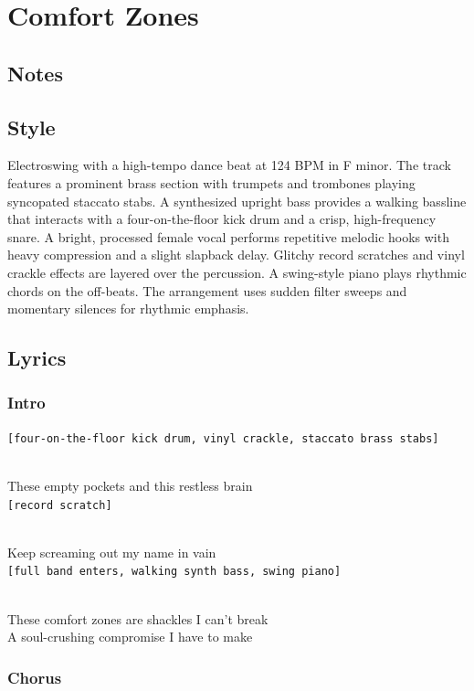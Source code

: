\documentclass[]{article}
\begin{document}
\section{Comfort Zones}\label{comfort-zones}

\subsection{Notes}\label{notes-15}

\subsection{Style}\label{style-15}

Electroswing with a high-tempo dance beat at 124 BPM in F minor. The
track features a prominent brass section with trumpets and trombones
playing syncopated staccato stabs. A synthesized upright bass provides a
walking bassline that interacts with a four-on-the-floor kick drum and a
crisp, high-frequency snare. A bright, processed female vocal performs
repetitive melodic hooks with heavy compression and a slight slapback
delay. Glitchy record scratches and vinyl crackle effects are layered
over the percussion. A swing-style piano plays rhythmic chords on the
off-beats. The arrangement uses sudden filter sweeps and momentary
silences for rhythmic emphasis.

\subsection{Lyrics}\label{lyrics-15}

\subsubsection{Intro}\label{intro-6}

\texttt{{[}four-on-the-floor\ kick\ drum,\ vinyl\ crackle,\ staccato\ brass\ stabs{]}}\strut \\
These empty pockets and this restless brain\\
\texttt{{[}record\ scratch{]}}\strut \\
Keep screaming out my name in vain\\
\texttt{{[}full\ band\ enters,\ walking\ synth\ bass,\ swing\ piano{]}}\strut \\
These comfort zones are shackles I can't break\\
A soul-crushing compromise I have to make

\subsubsection{Chorus}\label{chorus-21}
\end{document}
